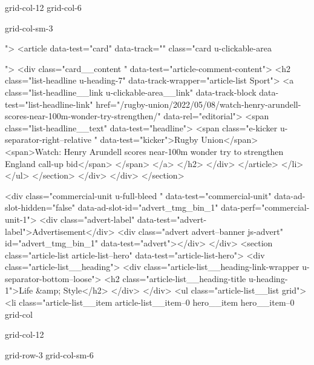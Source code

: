 {{{			
			
			grid-col-12
			grid-col-6
			
			
			
			
			
			grid-col-sm-3
			
			
			
			
			
			
			
			
			">
<article data-test="card" data-track="" class="card
			u-clickable-area
			
			
			
			
			
			
			
			
			 ">
<div class="card__content " data-test="article-comment-content">
<h2 class="list-headline  u-heading-7" data-track-wrapper="article-list Sport">
<a class="list-headline__link u-clickable-area__link" data-track-block data-test="list-headline-link" href="/rugby-union/2022/05/08/watch-henry-arundell-scores-near-100m-wonder-try-strengthen/" data-rel="editorial">
<span class="list-headline__text" data-test="headline">
<span class="e-kicker u-separator-right--relative " data-test="kicker">Rugby Union</span>
<span>Watch: Henry Arundell scores near-100m wonder try to strengthen England call-up bid</span>
</span>
</a>
</h2>
</div>
</article>
</li>
</ul>
</section>
</div>
</div>
</section>

		
			
				
			
	
<div class="commercial-unit u-full-bleed " data-test="commercial-unit" data-ad-slot-hidden="false" data-ad-slot-id="advert_tmg_bin_1" data-perf="commercial-unit-1">
<div class="advert-label" data-test="advert-label">Advertisement</div>
<div class="advert advert--banner js-advert" id="advert_tmg_bin_1" data-test="advert"></div>
</div>
<section class="article-list article-list--hero" data-test="article-list-hero">
<div class="article-list__heading">
<div class="article-list__heading-link-wrapper
				u-separator-bottom--loose">
<h2 class="article-list__heading-title u-heading-1">Life &amp; Style</h2>
</div>
</div>
<ul class="article-list__list grid">
<li class="article-list__item article-list__item--0 hero__item hero__item--0
			grid-col
			
			
			
			
			grid-col-12
			
			
			
			
			
			grid-row-3 grid-col-sm-6
			
			
			
}}}
